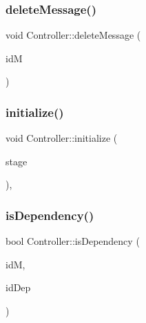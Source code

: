 \subsubsection{\texorpdfstring{delete\+Message()}{deleteMessage()}}
{\footnotesize\ttfamily void Controller\+::delete\+Message (\begin{DoxyParamCaption}\item[{\hyperlink{structures_8h_a83a1d9a070efa5341da84cfd8e28d3e5}{id\+Msg}}]{idM }\end{DoxyParamCaption})\hspace{0.3cm}{\ttfamily [private]}}

\mbox{\label{classController_aa813a54b625a16ee0c039838b8cdd661}} 
\subsubsection{\texorpdfstring{initialize()}{initialize()}}
{\footnotesize\ttfamily void Controller\+::initialize (\begin{DoxyParamCaption}\item[{int}]{stage }\end{DoxyParamCaption})\hspace{0.3cm}{\ttfamily [private]}, {\ttfamily [virtual]}}

\mbox{\label{classController_ad76a99df69bf99705dc18ba72b4b04c2}} 
\subsubsection{\texorpdfstring{is\+Dependency()}{isDependency()}}
{\footnotesize\ttfamily bool Controller\+::is\+Dependency (\begin{DoxyParamCaption}\item[{\hyperlink{structures_8h_a83a1d9a070efa5341da84cfd8e28d3e5}{id\+Msg}}]{idM,  }\item[{\hyperlink{structures_8h_a83a1d9a070efa5341da84cfd8e28d3e5}{id\+Msg}}]{id\+Dep }\end{DoxyParamCaption})}

\mbox{\label{classController_a8905abf1976e737410ac0142001e38a0}} 
